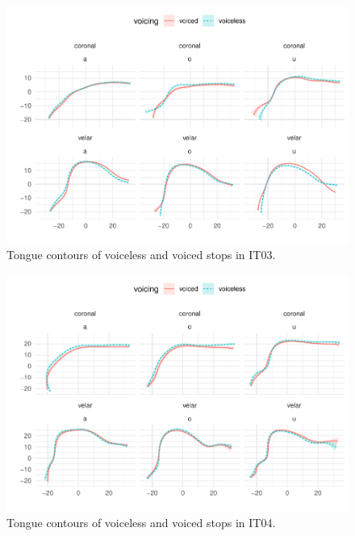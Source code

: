 \documentclass[11pt,]{article}
\begin{document}
\begin{figure}

{\centering \includegraphics[width=.8\textwidth]{2018-polar-gam_files/figure-latex/Figure08} 

}

\caption{Tongue contours of voiceless and voiced stops in IT03.}\label{f:Figure08}
\end{figure}

\begin{figure}

{\centering \includegraphics[width=.8\textwidth]{2018-polar-gam_files/figure-latex/Figure09} 

}

\caption{Tongue contours of voiceless and voiced stops in IT04.}\label{f:Figure09}
\end{figure}
\end{document}
